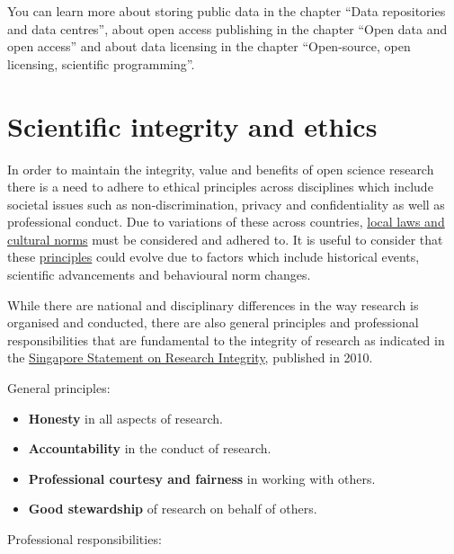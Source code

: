 \documentclass[
]{book}
\begin{document}
You can learn more about storing public data in the chapter ``Data repositories and data centres'', about open access publishing in the chapter ``Open data and open access'' and about data licensing in the chapter ``Open-source, open licensing, scientific programming''.

\hypertarget{scientific-integrity-and-ethics}{%
\section{Scientific integrity and ethics}\label{scientific-integrity-and-ethics}}

In order to maintain the integrity, value and benefits of open science research there is a need to adhere to ethical principles across disciplines which include societal issues such as non-discrimination, privacy and confidentiality as well as professional conduct. Due to variations of these across countries, \href{https://www.rand.org/}{local laws and cultural norms} must be considered and adhered to. It is useful to consider that these \href{https://the-turing-way.netlify.app/ethical-research/ethical-research.html}{principles} could evolve due to factors which include historical events, scientific advancements and behavioural norm changes.

While there are national and disciplinary differences in the way research is organised and conducted, there are also general principles and professional responsibilities that are fundamental to the integrity of research as indicated in the \href{https://wcrif.org/statement}{Singapore Statement on Research Integrity}, published in 2010.

General principles:

\begin{itemize}
\item
  \textbf{Honesty} in all aspects of research.
\item
  \textbf{Accountability} in the conduct of research.
\item
  \textbf{Professional courtesy and fairness} in working with others.
\item
  \textbf{Good stewardship} of research on behalf of others.
\end{itemize}

Professional responsibilities:
\end{document}
